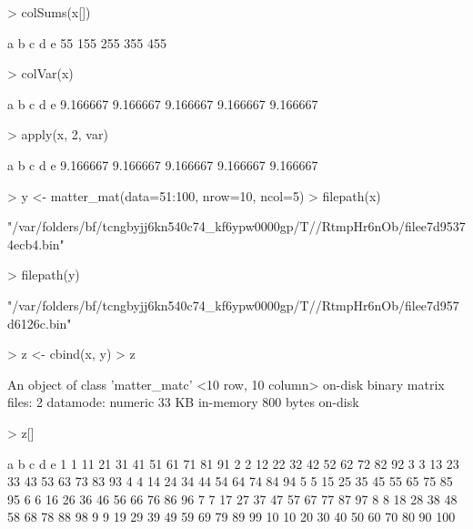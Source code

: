\documentclass[a4paper]{article}
\begin{document}
\begin{Schunk}
\begin{Sinput}
> colSums(x[])
\end{Sinput}
\begin{Soutput}
  a   b   c   d   e 
 55 155 255 355 455 
\end{Soutput}
\begin{Sinput}
> colVar(x)
\end{Sinput}
\begin{Soutput}
       a        b        c        d        e 
9.166667 9.166667 9.166667 9.166667 9.166667 
\end{Soutput}
\begin{Sinput}
> apply(x, 2, var)
\end{Sinput}
\begin{Soutput}
       a        b        c        d        e 
9.166667 9.166667 9.166667 9.166667 9.166667 
\end{Soutput}
\begin{Sinput}
> y <- matter_mat(data=51:100, nrow=10, ncol=5)
> filepath(x)
\end{Sinput}
\begin{Soutput}
[1] "/var/folders/bf/tcngbyjj6kn540c74_kf6ypw0000gp/T//RtmpHr6nOb/filee7d95374ecb4.bin"
\end{Soutput}
\begin{Sinput}
> filepath(y)
\end{Sinput}
\begin{Soutput}
[1] "/var/folders/bf/tcngbyjj6kn540c74_kf6ypw0000gp/T//RtmpHr6nOb/filee7d957d6126c.bin"
\end{Soutput}
\begin{Sinput}
> z <- cbind(x, y)
> z
\end{Sinput}
\begin{Soutput}
An object of class 'matter_matc'
  <10 row, 10 column> on-disk binary matrix
    files: 2
    datamode: numeric
    33 KB in-memory
    800 bytes on-disk
\end{Soutput}
\begin{Sinput}
> z[]
\end{Sinput}
\begin{Soutput}
    a  b  c  d  e                
1   1 11 21 31 41 51 61 71 81  91
2   2 12 22 32 42 52 62 72 82  92
3   3 13 23 33 43 53 63 73 83  93
4   4 14 24 34 44 54 64 74 84  94
5   5 15 25 35 45 55 65 75 85  95
6   6 16 26 36 46 56 66 76 86  96
7   7 17 27 37 47 57 67 77 87  97
8   8 18 28 38 48 58 68 78 88  98
9   9 19 29 39 49 59 69 79 89  99
10 10 20 30 40 50 60 70 80 90 100
\end{Soutput}

\end{Schunk}
\end{document}
